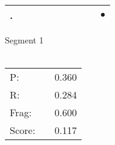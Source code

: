 \documentclass[landscape]{article}
\newcommand{\ssp}{\hspace{2pt}}
\newcommand{\mex}{\cellcolor{g}$\bullet$}
\begin{document}
\begin{tabular}{|l|p{10pt}|p{10pt}|p{10pt}|p{10pt}|p{10pt}|p{10pt}|p{10pt}|p{10pt}|p{10pt}|}
\hline
\ssp \cellcolor{ref8}. \ssp&\hspace{2pt}&\hspace{2pt}&\hspace{2pt}&\hspace{2pt}&\hspace{2pt}&\hspace{2pt}&\hspace{2pt}&\hspace{2pt}&\hspace{2pt}\mex\\
\hline
\end{tabular}

\vspace{6pt}
\noindent Segment 1\\\\
\noindent\begin{tabular}{lm{12pt}r}
\hline
P:&&0.360\\
R:&&0.284\\
Frag:&&0.600\\
Score:&&0.117\\
\end{tabular}

\newpage
\end{document}
